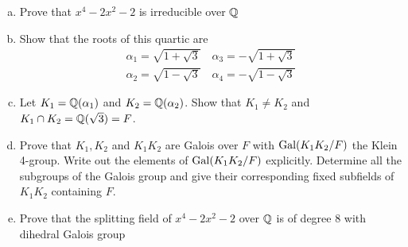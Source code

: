 \begin{exercise}
    \begin{enumerate}[(a)]
        \item Prove that $x^4 - 2x^2 - 2$ is irreducible over $\mathbb{Q}$

        \item Show that the roots of this quartic are
        \begin{align*}
            \alpha_1 = \sqrt{1 + \sqrt{3}} \quad \alpha_3 = -\sqrt{1 + \sqrt{3}} \\
            \alpha_2 = \sqrt{1 - \sqrt{3}} \quad \alpha_4 = -\sqrt{1 - \sqrt{3}}
        \end{align*}

        \item Let $K_1 = \mathbb{Q}(\alpha_1)$ and $K_2 = \mathbb{Q}(\alpha_2)$. Show that $K_1 \neq K_2$ and $K_1 \cap K_2 = \mathbb{Q}(\sqrt{3}) = F$.

        \item Prove that $K_1, K_2$ and $K_1K_2$ are Galois over $F$ with $\operatorname{Gal}(K_1K_2/F)$ the Klein 4-group. Write out the elements of $\operatorname{Gal}(K_1K_2/F)$ explicitly. Determine all the subgroups of the Galois group and give their corresponding fixed subfields of $K_1K_2$ containing $F$.

        \item Prove that the splitting field of $x^4 - 2x^2 - 2$ over $\mathbb{Q}$ is of degree 8 with dihedral Galois group 
    \end{enumerate}
\end{exercise}
